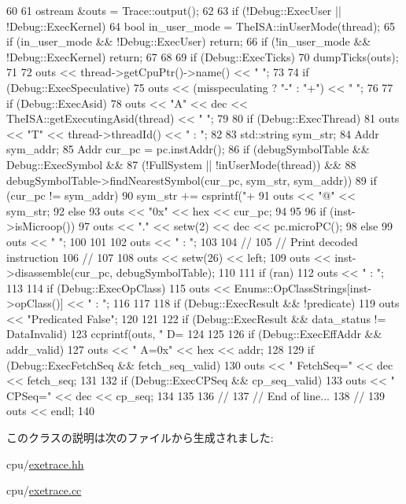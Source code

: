 \begin{DoxyCode}
60 {
61     ostream &outs = Trace::output();
62 
63     if (!Debug::ExecUser || !Debug::ExecKernel) {
64         bool in_user_mode = TheISA::inUserMode(thread);
65         if (in_user_mode && !Debug::ExecUser) return;
66         if (!in_user_mode && !Debug::ExecKernel) return;
67     }
68 
69     if (Debug::ExecTicks)
70         dumpTicks(outs);
71 
72     outs << thread->getCpuPtr()->name() << " ";
73 
74     if (Debug::ExecSpeculative)
75         outs << (misspeculating ? "-" : "+") << " ";
76 
77     if (Debug::ExecAsid)
78         outs << "A" << dec << TheISA::getExecutingAsid(thread) << " ";
79 
80     if (Debug::ExecThread)
81         outs << "T" << thread->threadId() << " : ";
82 
83     std::string sym_str;
84     Addr sym_addr;
85     Addr cur_pc = pc.instAddr();
86     if (debugSymbolTable && Debug::ExecSymbol &&
87             (!FullSystem || !inUserMode(thread)) &&
88             debugSymbolTable->findNearestSymbol(cur_pc, sym_str, sym_addr)) {
89         if (cur_pc != sym_addr)
90             sym_str += csprintf("+%
91         outs << "@" << sym_str;
92     } else {
93         outs << "0x" << hex << cur_pc;
94     }
95 
96     if (inst->isMicroop()) {
97         outs << "." << setw(2) << dec << pc.microPC();
98     } else {
99         outs << "   ";
100     }
101 
102     outs << " : ";
103 
104     //
105     //  Print decoded instruction
106     //
107 
108     outs << setw(26) << left;
109     outs << inst->disassemble(cur_pc, debugSymbolTable);
110 
111     if (ran) {
112         outs << " : ";
113 
114         if (Debug::ExecOpClass) {
115             outs << Enums::OpClassStrings[inst->opClass()] << " : ";
116         }
117 
118         if (Debug::ExecResult && !predicate) {
119             outs << "Predicated False";
120         }
121 
122         if (Debug::ExecResult && data_status != DataInvalid) {
123             ccprintf(outs, " D=%
124         }
125 
126         if (Debug::ExecEffAddr && addr_valid)
127             outs << " A=0x" << hex << addr;
128 
129         if (Debug::ExecFetchSeq && fetch_seq_valid)
130             outs << "  FetchSeq=" << dec << fetch_seq;
131 
132         if (Debug::ExecCPSeq && cp_seq_valid)
133             outs << "  CPSeq=" << dec << cp_seq;
134     }
135 
136     //
137     //  End of line...
138     //
139     outs << endl;
140 }
\end{DoxyCode}


このクラスの説明は次のファイルから生成されました:\begin{DoxyCompactItemize}
\item 
cpu/\hyperlink{exetrace_8hh}{exetrace.hh}\item 
cpu/\hyperlink{exetrace_8cc}{exetrace.cc}\end{DoxyCompactItemize}
